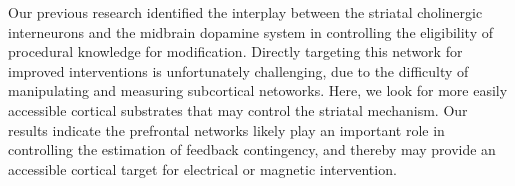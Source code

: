 Our previous research identified the interplay between the striatal cholinergic
interneurons and the midbrain dopamine system in controlling the eligibility of
procedural knowledge for modification. Directly targeting this network for
improved interventions is unfortunately challenging, due to the difficulty of
manipulating and measuring subcortical netoworks. Here, we look for more easily
accessible cortical substrates that may control the striatal mechanism. Our
results indicate the prefrontal networks likely play an important role in
controlling the estimation of feedback contingency, and thereby may provide an
accessible cortical target for electrical or magnetic intervention.

 
